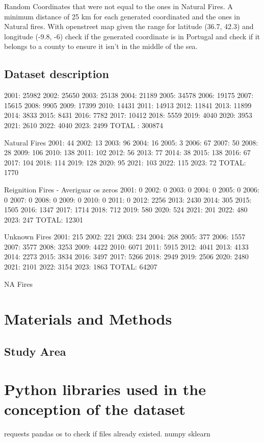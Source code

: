 Random Coordinates that were not equal to the ones in Natural Fires. A minimum distance of 25 km for each generated coordinated and the ones in Natural fires. With openstreet map given the range for latitude (36.7, 42.3) and longitude (-9.8, -6) check if the generated coordinate is in Portugal and check if it belongs to a county to ensure it isn't in the middle of the sea.

\subsection{Dataset description}
2001: 25982
2002: 25650
2003: 25138
2004: 21189
2005: 34578
2006: 19175
2007: 15615
2008: 9905
2009: 17399
2010: 14431
2011: 14913
2012: 11841
2013: 11899
2014: 3833
2015: 8431
2016: 7782
2017: 10412
2018: 5559
2019: 4040
2020: 3953
2021: 2610
2022: 4040
2023: 2499
TOTAL : 300874

Natural Fires
2001: 44
2002: 13
2003: 96
2004: 16
2005: 3
2006: 67
2007: 50
2008: 28
2009: 106
2010: 138
2011: 102
2012: 56
2013: 77
2014: 38
2015: 138
2016: 67
2017: 104
2018: 114
2019: 128
2020: 95
2021: 103
2022: 115
2023: 72
TOTAL: 1770

Reignition Fires - Averiguar os zeros
2001: 0
2002: 0
2003: 0
2004: 0
2005: 0
2006: 0
2007: 0
2008: 0
2009: 0
2010: 0
2011: 0
2012: 2256
2013: 2430
2014: 305
2015: 1505
2016: 1347
2017: 1714
2018: 712
2019: 580
2020: 524
2021: 201
2022: 480
2023: 247
TOTAL: 12301

Unknown Fires
2001: 215
2002: 221
2003: 234
2004: 268
2005: 377
2006: 1557
2007: 3577
2008: 3253
2009: 4422
2010: 6071
2011: 5915
2012: 4041
2013: 4133
2014: 2273
2015: 3834
2016: 3497
2017: 5266
2018: 2949
2019: 2506
2020: 2480
2021: 2101
2022: 3154
2023: 1863
TOTAL: 64207

NA Fires


\section{Materials and Methods}

\subsection{Study Area}







\section{Python libraries used in the conception of the dataset}
requests
pandas
os to check if files already existed.
numpy
sklearn



